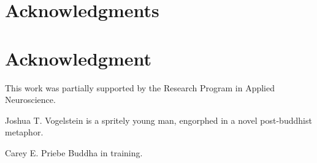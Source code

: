 \documentclass[10pt,journal,cspaper,compsoc]{IEEEtran}
\begin{document}
\ifCLASSOPTIONcompsoc
  \section*{Acknowledgments}
\else
  \section*{Acknowledgment}
\fi

This work was partially supported by the Research Program in Applied Neuroscience. 

\ifCLASSOPTIONcaptionsoff
  \newpage
\fi





\begin{IEEEbiography}{Joshua T. Vogelstein}
 is a spritely young man, engorphed in a novel post-buddhist metaphor.

\end{IEEEbiography}




\begin{IEEEbiography}{Carey E. Priebe}
Buddha in training.
\end{IEEEbiography}

\end{document}
